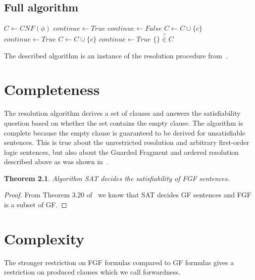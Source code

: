 \documentclass[english, shortabstract]{iithesis}
\theoremstyle{definition} \newtheorem{definition}{Definition}[chapter]
\theoremstyle{remark} \newtheorem{remark}[definition]{Observation}
\theoremstyle{plain} \newtheorem{theorem}[definition]{Theorem}
\theoremstyle{plain} \newtheorem{lemma}[definition]{Lemma}
\begin{document}
\section{Full algorithm}

\begin{algorithm}\label{alg:sat}
\begin{algorithmic}
\State $C \gets CNF(\phi)$
\State $continue \gets True$
\State $continue \gets False$
    \State $C \gets C \cup \{c\}$
    \State $continue \gets True$
\EndIf
{}
    \State $C \gets C \cup \{c\}$
    \State $continue \gets True$
\EndIf
\EndFor
\EndWhile
\State
\Return $\{\} \stackrel{?}{\in} C$
\EndProcedure
\end{algorithmic}
\end{algorithm}

The described algorithm is an instance of the resolution procedure from~\cite{nivelle}.

\chapter{Completeness}

The resolution algorithm derives a set of clauses and answers the satisfiability question 
based on whether the set contains the empty clause. The algorithm is complete because 
the empty clause is guaranteed to be derived for unsatisfiable sentences.
This is true about the unrestricted resolution and arbitrary first-order logic sentences, 
but also about the Guarded Fragment and ordered resolution described above as was shown in~\cite{nivelle}.

\begin{theorem}
Algorithm SAT decides the satisfiability of FGF sentences.
\end{theorem}

\begin{proof}
From Theorem 3.20 of~\cite{nivelle} we know that SAT decides GF sentences and FGF is a subset of GF.
\end{proof}

\chapter{Complexity}

The stronger restriction on FGF formulas compared to GF formulas gives a restriction on produced clauses which we call forwardness.
\end{document}
